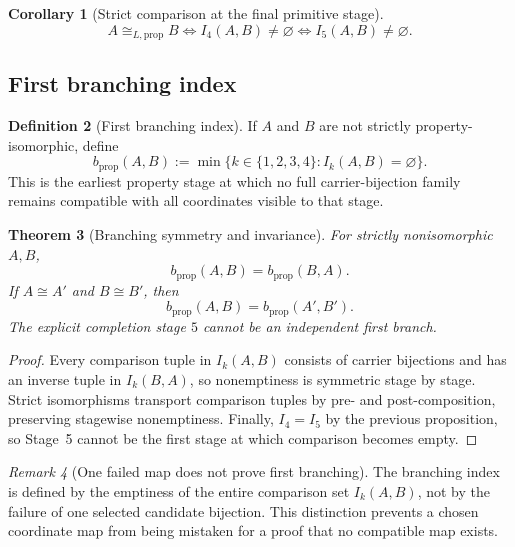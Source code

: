 \documentclass[11pt]{article}
\newtheorem{theorem}{Theorem}[section]
\newtheorem{corollary}[theorem]{Corollary}
\theoremstyle{definition}
\newtheorem{definition}[theorem]{Definition}
\theoremstyle{remark}
\newtheorem{remark}[theorem]{Remark}
\begin{document}
\begin{corollary}[Strict comparison at the final primitive stage]
\[
A\cong_{L,\mathrm{prop}}B
\Longleftrightarrow
I_4(A,B)\neq\varnothing
\Longleftrightarrow
I_5(A,B)\neq\varnothing.
\]
\end{corollary}

\subsection{First branching index}

\begin{definition}[First branching index]
If \(A\) and \(B\) are not strictly property-isomorphic, define
\[
b_{\mathrm{prop}}(A,B):=
\min\{k\in\{1,2,3,4\}:I_k(A,B)=\varnothing\}.
\]
This is the earliest property stage at which no full carrier-bijection family remains compatible with all coordinates visible to that stage.
\end{definition}

\begin{theorem}[Branching symmetry and invariance]
\label{thm:branching-invariance}
For strictly nonisomorphic \(A,B\),
\[
b_{\mathrm{prop}}(A,B)=b_{\mathrm{prop}}(B,A).
\]
If \(A\cong A'\) and \(B\cong B'\), then
\[
b_{\mathrm{prop}}(A,B)=b_{\mathrm{prop}}(A',B').
\]
The explicit completion stage \(5\) cannot be an independent first branch.
\end{theorem}

\begin{proof}
Every comparison tuple in \(I_k(A,B)\) consists of carrier bijections and has an inverse tuple in \(I_k(B,A)\), so nonemptiness is symmetric stage by stage.
Strict isomorphisms transport comparison tuples by pre- and post-composition, preserving stagewise nonemptiness.
Finally, \(I_4=I_5\) by the previous proposition, so Stage~5 cannot be the first stage at which comparison becomes empty.
\end{proof}

\begin{remark}[One failed map does not prove first branching]
The branching index is defined by the emptiness of the entire comparison set \(I_k(A,B)\), not by the failure of one selected candidate bijection.
This distinction prevents a chosen coordinate map from being mistaken for a proof that no compatible map exists.
\end{remark}

\end{document}
